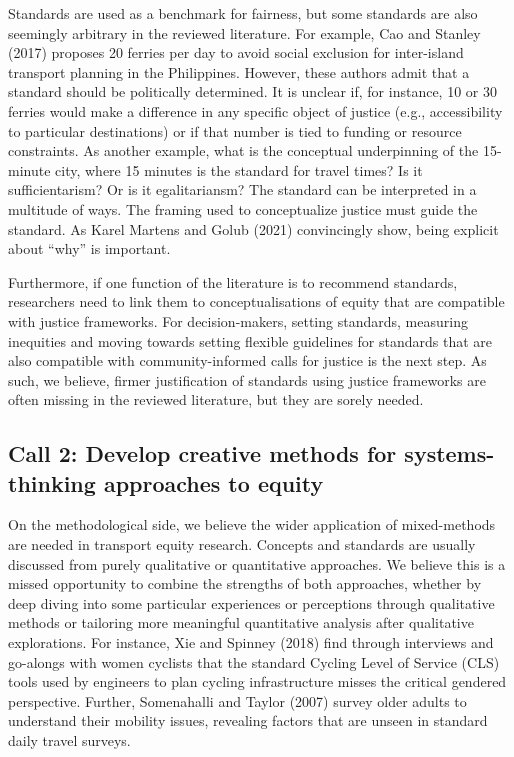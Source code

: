 \documentclass[12pt, oneside]{report}
\begin{document}
Standards are used as a benchmark for fairness, but some standards are
also seemingly arbitrary in the reviewed literature. For example, Cao
and Stanley (2017) proposes 20 ferries per day to avoid social exclusion
for inter-island transport planning in the Philippines. However, these
authors admit that a standard should be politically determined. It is
unclear if, for instance, 10 or 30 ferries would make a difference in
any specific object of justice (e.g., accessibility to particular
destinations) or if that number is tied to funding or resource
constraints. As another example, what is the conceptual underpinning of
the 15-minute city, where 15 minutes is the standard for travel times?
Is it sufficientarism? Or is it egalitariansm? The standard can be
interpreted in a multitude of ways. The framing used to conceptualize
justice must guide the standard. As Karel Martens and Golub (2021)
convincingly show, being explicit about ``why'' is important.

Furthermore, if one function of the literature is to recommend
standards, researchers need to link them to conceptualisations of equity
that are compatible with justice frameworks. For decision-makers,
setting standards, measuring inequities and moving towards setting
flexible guidelines for standards that are also compatible with
community-informed calls for justice is the next step. As such, we
believe, firmer justification of standards using justice frameworks are
often missing in the reviewed literature, but they are sorely needed.

\hypertarget{call-2-develop-creative-methods-for-systems-thinking-approaches-to-equity}{%
\subsection{Call 2: Develop creative methods for systems-thinking
approaches to
equity}\label{call-2-develop-creative-methods-for-systems-thinking-approaches-to-equity}}

On the methodological side, we believe the wider application of
mixed-methods are needed in transport equity research. Concepts and
standards are usually discussed from purely qualitative or quantitative
approaches. We believe this is a missed opportunity to combine the
strengths of both approaches, whether by deep diving into some
particular experiences or perceptions through qualitative methods or
tailoring more meaningful quantitative analysis after qualitative
explorations. For instance, Xie and Spinney (2018) find through
interviews and go-alongs with women cyclists that the standard Cycling
Level of Service (CLS) tools used by engineers to plan cycling
infrastructure misses the critical gendered perspective. Further,
Somenahalli and Taylor (2007) survey older adults to understand their
mobility issues, revealing factors that are unseen in standard daily
travel surveys.
\end{document}

